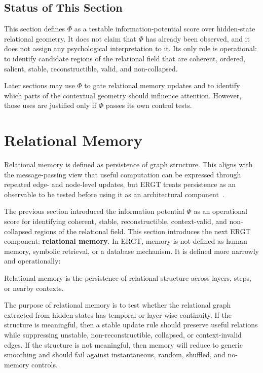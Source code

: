 \documentclass[11pt]{article}
\begin{document}
\subsection{Status of This Section}

This section defines $\Phi$ as a testable information-potential score over hidden-state relational geometry. It does not claim that $\Phi$ has already been observed, and it does not assign any psychological interpretation to it. Its only role is operational: to identify candidate regions of the relational field that are coherent, ordered, salient, stable, reconstructible, valid, and non-collapsed.

Later sections may use $\Phi$ to gate relational memory updates and to identify which parts of the contextual geometry should influence attention. However, those uses are justified only if $\Phi$ passes its own control tests.


\section{Relational Memory}
\noindent Relational memory is defined as persistence of graph structure. This aligns with the message-passing view that useful computation can be expressed through repeated edge- and node-level updates, but ERGT treats persistence as an observable to be tested before using it as an architectural component~\cite{battaglia2018relational,gilmer2017neural}.


The previous section introduced the information potential $\Phi$ as an operational score for identifying coherent, stable, reconstructible, context-valid, and non-collapsed regions of the relational field. This section introduces the next ERGT component: \textbf{relational memory}. In ERGT, memory is not defined as human memory, symbolic retrieval, or a database mechanism. It is defined more narrowly and operationally:

\begin{ergtclaim}
Relational memory is the persistence of relational structure across layers, steps, or nearby contexts.
\end{ergtclaim}

The purpose of relational memory is to test whether the relational graph extracted from hidden states has temporal or layer-wise continuity. If the structure is meaningful, then a stable update rule should preserve useful relations while suppressing unstable, non-reconstructible, collapsed, or context-invalid edges. If the structure is not meaningful, then memory will reduce to generic smoothing and should fail against instantaneous, random, shuffled, and no-memory controls.
\end{document}
